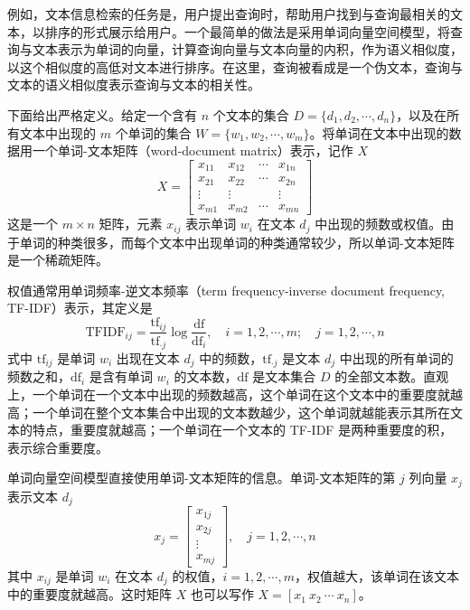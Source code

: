 \documentclass[UTF8, 12pt, fontset=fandol, oneside]{ctexart}
\begin{document}
例如，文本信息检索的任务是，用户提出查询时，帮助用户找到与查询最相关的文本，以排序的形式展示给用户。一个最简单的做法是采用单词向量空间模型，将查询与文本表示为单词的向量，计算查询向量与文本向量的内积，作为语义相似度，以这个相似度的高低对文本进行排序。在这里，查询被看成是一个伪文本，查询与文本的语义相似度表示查询与文本的相关性。

下面给出严格定义。给定一个含有 $n$ 个文本的集合 $D=\{d_1,d_2,\cdots,d_n\}$，以及在所有文本中出现的 $m$ 个单词的集合 $W=\{w_1,w_2,\cdots,w_m\}$。将单词在文本中出现的数据用一个单词-文本矩阵（word-document matrix）表示，记作 $X$
\begin{equation}
X=
\begin{bmatrix}
x_{11} & x_{12} & \cdots & x_{1n}\\
x_{21} & x_{22} & \cdots & x_{2n}\\
\vdots & \vdots & & \vdots\\
x_{m1} & x_{m2} & \cdots & x_{mn}
\end{bmatrix}
\tag{17.1}
\end{equation}
这是一个 $m\times n$ 矩阵，元素 $x_{ij}$ 表示单词 $w_i$ 在文本 $d_j$ 中出现的频数或权值。由于单词的种类很多，而每个文本中出现单词的种类通常较少，所以单词-文本矩阵是一个稀疏矩阵。

权值通常用单词频率-逆文本频率（term frequency-inverse document frequency, TF-IDF）表示，其定义是
\begin{equation}
\mathrm{TFIDF}_{ij}=\frac{\mathrm{tf}_{ij}}{\mathrm{tf}_{\cdot j}}\log\frac{\mathrm{df}}{\mathrm{df}_i},\quad
i=1,2,\cdots,m;\quad j=1,2,\cdots,n
\tag{17.2}
\end{equation}
式中 $\mathrm{tf}_{ij}$ 是单词 $w_i$ 出现在文本 $d_j$ 中的频数，$\mathrm{tf}_{\cdot j}$ 是文本 $d_j$ 中出现的所有单词的频数之和，$\mathrm{df}_i$ 是含有单词 $w_i$ 的文本数，$\mathrm{df}$ 是文本集合 $D$ 的全部文本数。直观上，一个单词在一个文本中出现的频数越高，这个单词在这个文本中的重要度就越高；一个单词在整个文本集合中出现的文本数越少，这个单词就越能表示其所在文本的特点，重要度就越高；一个单词在一个文本的 TF-IDF 是两种重要度的积，表示综合重要度。

单词向量空间模型直接使用单词-文本矩阵的信息。单词-文本矩阵的第 $j$ 列向量 $x_j$ 表示文本 $d_j$
\begin{equation}
x_j=
\begin{bmatrix}
x_{1j}\\
x_{2j}\\
\vdots\\
x_{mj}
\end{bmatrix},
\quad j=1,2,\cdots,n
\tag{17.3}
\end{equation}
其中 $x_{ij}$ 是单词 $w_i$ 在文本 $d_j$ 的权值，$i=1,2,\cdots,m$，权值越大，该单词在该文本中的重要度就越高。这时矩阵 $X$ 也可以写作 $X=[x_1\ x_2\ \cdots\ x_n]$。
\end{document}

